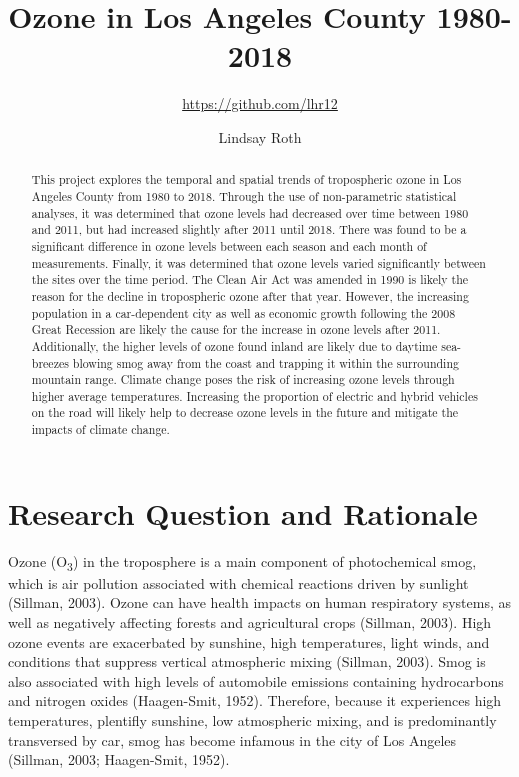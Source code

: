 \documentclass[12pt,]{article}
\title{Ozone in Los Angeles County 1980-2018}
\subtitle{\url{https://github.com/lhr12}}
\author{Lindsay Roth}
\date{}
\begin{document}
\maketitle
\begin{abstract}
This project explores the temporal and spatial trends of tropospheric
ozone in Los Angeles County from 1980 to 2018. Through the use of
non-parametric statistical analyses, it was determined that ozone levels
had decreased over time between 1980 and 2011, but had increased
slightly after 2011 until 2018. There was found to be a significant
difference in ozone levels between each season and each month of
measurements. Finally, it was determined that ozone levels varied
significantly between the sites over the time period. The Clean Air Act
was amended in 1990 is likely the reason for the decline in tropospheric
ozone after that year. However, the increasing population in a
car-dependent city as well as economic growth following the 2008 Great
Recession are likely the cause for the increase in ozone levels after
2011. Additionally, the higher levels of ozone found inland are likely
due to daytime sea-breezes blowing smog away from the coast and trapping
it within the surrounding mountain range. Climate change poses the risk
of increasing ozone levels through higher average temperatures.
Increasing the proportion of electric and hybrid vehicles on the road
will likely help to decrease ozone levels in the future and mitigate the
impacts of climate change.
\end{abstract}

\newpage

\tableofcontents  \newpage
\listoftables  \newpage
\listoffigures  \newpage

\section{Research Question and
Rationale}\label{research-question-and-rationale}

Ozone (O\textsubscript{3}) in the troposphere is a main component of
photochemical smog, which is air pollution associated with chemical
reactions driven by sunlight (Sillman, 2003). Ozone can have health
impacts on human respiratory systems, as well as negatively affecting
forests and agricultural crops (Sillman, 2003). High ozone events are
exacerbated by sunshine, high temperatures, light winds, and conditions
that suppress vertical atmospheric mixing (Sillman, 2003). Smog is also
associated with high levels of automobile emissions containing
hydrocarbons and nitrogen oxides (Haagen-Smit, 1952). Therefore, because
it experiences high temperatures, plentifly sunshine, low atmospheric
mixing, and is predominantly transversed by car, smog has become
infamous in the city of Los Angeles (Sillman, 2003; Haagen-Smit, 1952).
\end{document}
